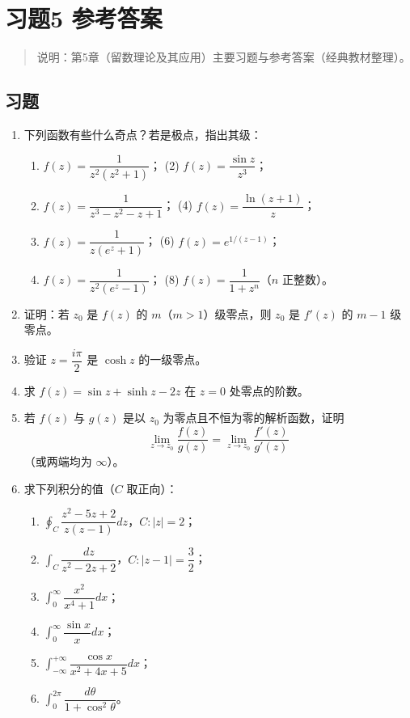 \chapter{习题5 参考答案}\label{ux4e60ux98985-ux53c2ux8003ux7b54ux6848}

\begin{quote}
说明：第5章（留数理论及其应用）主要习题与参考答案（经典教材整理）。
\end{quote}

\section{习题}\label{ux4e60ux9898-4}

\begin{enumerate}
\def\labelenumi{\arabic{enumi}.}
\item
  下列函数有些什么奇点？若是极点，指出其级：

  \begin{enumerate}
  \def\labelenumii{(\arabic{enumii})}
  \tightlist
  \item
    \(f(z)=\dfrac{1}{z^2(z^2+1)}\)； (2) \(f(z)=\dfrac{\sin z}{z^3}\)；
  \item
    \(f(z)=\dfrac{1}{z^3-z^2-z+1}\)； (4) \(f(z)=\dfrac{\ln(z+1)}{z}\)；
  \item
    \(f(z)=\dfrac{1}{z(e^z+1)}\)； (6) \(f(z)=e^{1/(z-1)}\)；
  \item
    \(f(z)=\dfrac{1}{z^2(e^z-1)}\)； (8)
    \(f(z)=\dfrac{1}{1+z^n}\)（\(n\) 正整数）。
  \end{enumerate}
\item
  证明：若 \(z_0\) 是 \(f(z)\) 的 \(m\)（\(m>1\)）级零点，则 \(z_0\) 是
  \(f'(z)\) 的 \(m-1\) 级零点。
\item
  验证 \(z=\dfrac{i\pi}{2}\) 是 \(\cosh z\) 的一级零点。
\item
  求 \(f(z)=\sin z+\sinh z-2z\) 在 \(z=0\) 处零点的阶数。
\item
  若 \(f(z)\) 与 \(g(z)\) 是以 \(z_0\) 为零点且不恒为零的解析函数，证明
  \[
  \lim_{z\to z_0}\frac{f(z)}{g(z)}=\lim_{z\to z_0}\frac{f'(z)}{g'(z)}
  \] （或两端均为 \(\infty\)）。
\item
  求下列积分的值（\(C\) 取正向）：

  \begin{enumerate}
  \def\labelenumii{(\arabic{enumii})}
  \tightlist
  \item
    \(\oint_C\dfrac{z^2-5z+2}{z(z-1)}dz\)，\(C:|z|=2\)；
  \item
    \(\int_C\dfrac{dz}{z^2-2z+2}\)，\(C:|z-1|=\dfrac32\)；
  \item
    \(\int_0^\infty\dfrac{x^2}{x^4+1}dx\)；
  \item
    \(\int_0^\infty\dfrac{\sin x}{x}dx\)；
  \item
    \(\int_{-\infty}^{+\infty}\dfrac{\cos x}{x^2+4x+5}dx\)；
  \item
    \(\int_0^{2\pi}\dfrac{d\theta}{1+\cos^2\theta}\)。
  \end{enumerate}
\end{enumerate}

